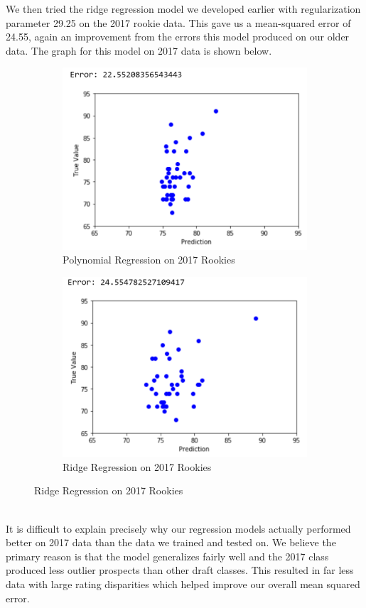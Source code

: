 \documentclass{article}
\begin{document}
We then tried the ridge regression model we developed earlier with regularization parameter 29.25 on the 2017 rookie data. This gave us a mean-squared error of 24.55, again an improvement from the errors this model produced on our older data. The graph for this model on 2017 data is shown below.\\
\begin{figure}[h]
\begin{subfigure}{0.5\textwidth}
\includegraphics[width=0.9\linewidth]{polyregonlatest.png} 
\caption{Polynomial Regression on 2017 Rookies}
\end{subfigure}
\begin{subfigure}{0.5\textwidth}
\includegraphics[width=0.9\linewidth]{ridgeregonlatest.png}
\caption{Ridge Regression on 2017 Rookies}
\end{subfigure}
\end{figure}\\
It is difficult to explain precisely why our regression models actually performed better on 2017 data than the data we trained and tested on. We believe the primary reason is that the model generalizes fairly well and the 2017 class produced less outlier prospects than other draft classes. This resulted in far less data with large rating disparities which helped improve our overall mean squared error.
\end{document}
